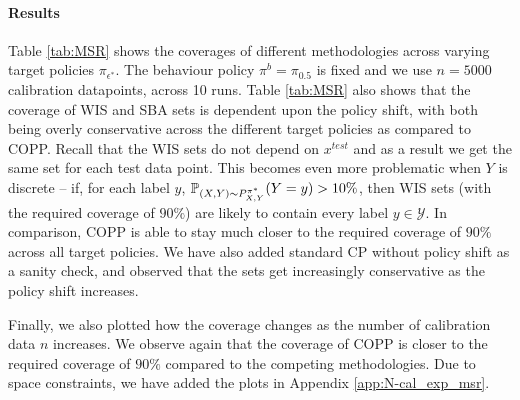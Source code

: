\paragraph{Results}
Table \ref{tab:MSR} shows the coverages of different methodologies across varying target policies $\pi_{\epsilon^*}$. The behaviour policy $\pi^b = \pi_{0.5}$ is fixed and we use $n=5000$ calibration datapoints, across 10 runs. Table \ref{tab:MSR} also shows that the coverage of WIS and SBA sets is dependent upon the policy shift, with both being overly conservative across the different target policies as compared to COPP. Recall that the WIS sets do not depend on $x^{test}$ and as a result we get the same set for each test data point. This becomes even more problematic when $Y$ is discrete -- if, for each label $y$, $\mathbb{P}_{(X,Y)\sim P^{\pi^*}_{X,Y}}(Y = y)>10\%$, then WIS sets (with the required coverage of $90\%$) are likely to contain every label $y \in \mathcal{Y}$.
In comparison, COPP is able to stay much closer to the required coverage of $90\%$ across all target policies. We have also added standard CP without policy shift as a sanity check, and observed that the sets get increasingly conservative as the policy shift increases.

Finally, we also plotted how the coverage changes as the number of calibration data $n$ increases. We observe again that the coverage of COPP is closer to the required coverage of $90\%$ compared to the competing methodologies. Due to space constraints, we have added the plots in Appendix \ref{app:N-cal_exp_msr}.

